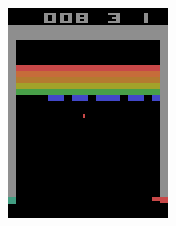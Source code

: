 \begin{figure}
\begin{subfigure}[h]{0.19\linewidth}
\includegraphics[width=\linewidth]{images/frame-sequence-0.png}
\end{subfigure}
\hfill
\begin{subfigure}[h]{0.19\linewidth}

\end{subfigure}
\end{figure}
